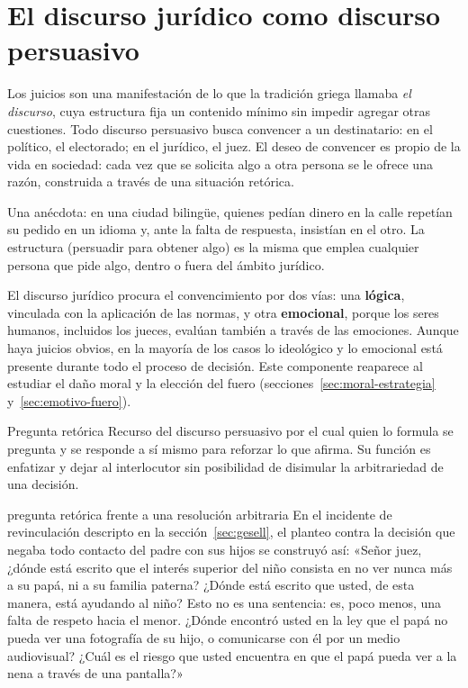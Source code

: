 \documentclass[12pt,oneside]{book}
\begin{document}
\section{El discurso jurídico como discurso persuasivo}\label{sec:retorica}

Los juicios son una manifestación de lo que la tradición griega llamaba \emph{el discurso}, cuya estructura fija un contenido mínimo sin impedir agregar otras cuestiones. Todo discurso persuasivo busca convencer a un destinatario: en el político, el electorado; en el jurídico, el juez. El deseo de convencer es propio de la vida en sociedad: cada vez que se solicita algo a otra persona se le ofrece una razón, construida a través de una situación retórica.

\begin{nota}
Una anécdota: en una ciudad bilingüe, quienes pedían dinero en la calle repetían su pedido en un idioma y, ante la falta de respuesta, insistían en el otro. La estructura (persuadir para obtener algo) es la misma que emplea cualquier persona que pide algo, dentro o fuera del ámbito jurídico.
\end{nota}

El discurso jurídico procura el convencimiento por dos vías: una \textbf{lógica}, vinculada con la aplicación de las normas, y otra \textbf{emocional}, porque los seres humanos, incluidos los jueces, evalúan también a través de las emociones. Aunque haya juicios obvios, en la mayoría de los casos lo ideológico y lo emocional está presente durante todo el proceso de decisión. Este componente reaparece al estudiar el daño moral y la elección del fuero (secciones~\ref{sec:moral-estrategia} y~\ref{sec:emotivo-fuero}).

\begin{definicion}{Pregunta retórica}
Recurso del discurso persuasivo por el cual quien lo formula se pregunta y se responde a sí mismo para reforzar lo que afirma. Su función es enfatizar y dejar al interlocutor sin posibilidad de disimular la arbitrariedad de una decisión.
\end{definicion}

\begin{ejemplo}{pregunta retórica frente a una resolución arbitraria}
En el incidente de revinculación descripto en la sección~\ref{sec:gesell}, el planteo contra la decisión que negaba todo contacto del padre con sus hijos se construyó así: «Señor juez, ¿dónde está escrito que el interés superior del niño consista en no ver nunca más a su papá, ni a su familia paterna? ¿Dónde está escrito que usted, de esta manera, está ayudando al niño? Esto no es una sentencia: es, poco menos, una falta de respeto hacia el menor. ¿Dónde encontró usted en la ley que el papá no pueda ver una fotografía de su hijo, o comunicarse con él por un medio audiovisual? ¿Cuál es el riesgo que usted encuentra en que el papá pueda ver a la nena a través de una pantalla?»
\end{ejemplo}
\end{document}
